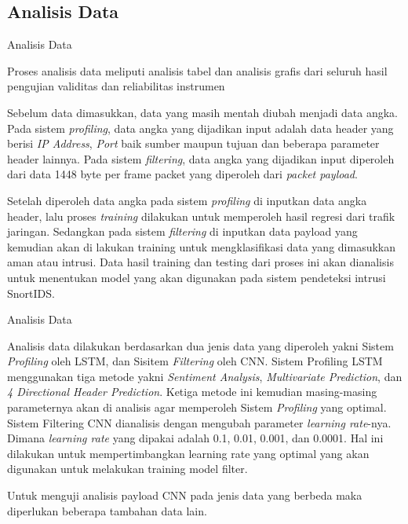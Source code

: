 \documentclass[t]{beamer}
\begin{document}
\subsection{Analisis Data}
\begin{frame}{Analisis Data}
	\par Proses analisis data meliputi analisis tabel dan analisis grafis dari seluruh hasil pengujian validitas dan reliabilitas instrumen
	\par Sebelum data dimasukkan, data yang masih mentah diubah menjadi data angka. Pada sistem \textit{profiling}, data angka yang dijadikan input adalah data header yang berisi \textit{IP Address}, \textit{Port} baik sumber maupun tujuan dan beberapa parameter header lainnya. Pada sistem \textit{filtering}, data angka yang dijadikan input diperoleh dari data 1448 byte per frame packet yang diperoleh dari \textit{packet payload}.
	\par Setelah diperoleh data angka pada sistem \textit{profiling} di inputkan data angka header, lalu proses \textit{training} dilakukan untuk memperoleh hasil regresi dari trafik jaringan. Sedangkan pada sistem \textit{filtering} di inputkan data payload yang kemudian akan di lakukan training untuk mengklasifikasi data yang dimasukkan aman atau intrusi. Data hasil training dan testing dari proses ini akan dianalisis untuk menentukan model yang akan digunakan pada sistem pendeteksi intrusi SnortIDS.
\end{frame}
\begin{frame}{Analisis Data}
	\par Analisis data dilakukan berdasarkan dua jenis data yang diperoleh yakni Sistem \textit{Profiling} oleh LSTM, dan Sisitem \textit{Filtering} oleh CNN. Sistem Profiling LSTM menggunakan tiga metode yakni \textit{Sentiment Analysis}, \textit{Multivariate Prediction}, dan \textit{4 Directional Header Prediction}. Ketiga metode ini kemudian masing-masing parameternya akan di analisis agar memperoleh Sistem \textit{Profiling} yang optimal. Sistem Filtering CNN dianalisis dengan mengubah parameter \textit{learning rate}-nya. Dimana \textit{learning rate} yang dipakai adalah 0.1, 0.01, 0.001, dan 0.0001. Hal ini dilakukan untuk mempertimbangkan learning rate yang optimal yang akan digunakan untuk melakukan training model filter.
	\par Untuk menguji analisis payload CNN pada jenis data yang berbeda maka diperlukan beberapa tambahan data lain.
\end{frame}
\end{document}
